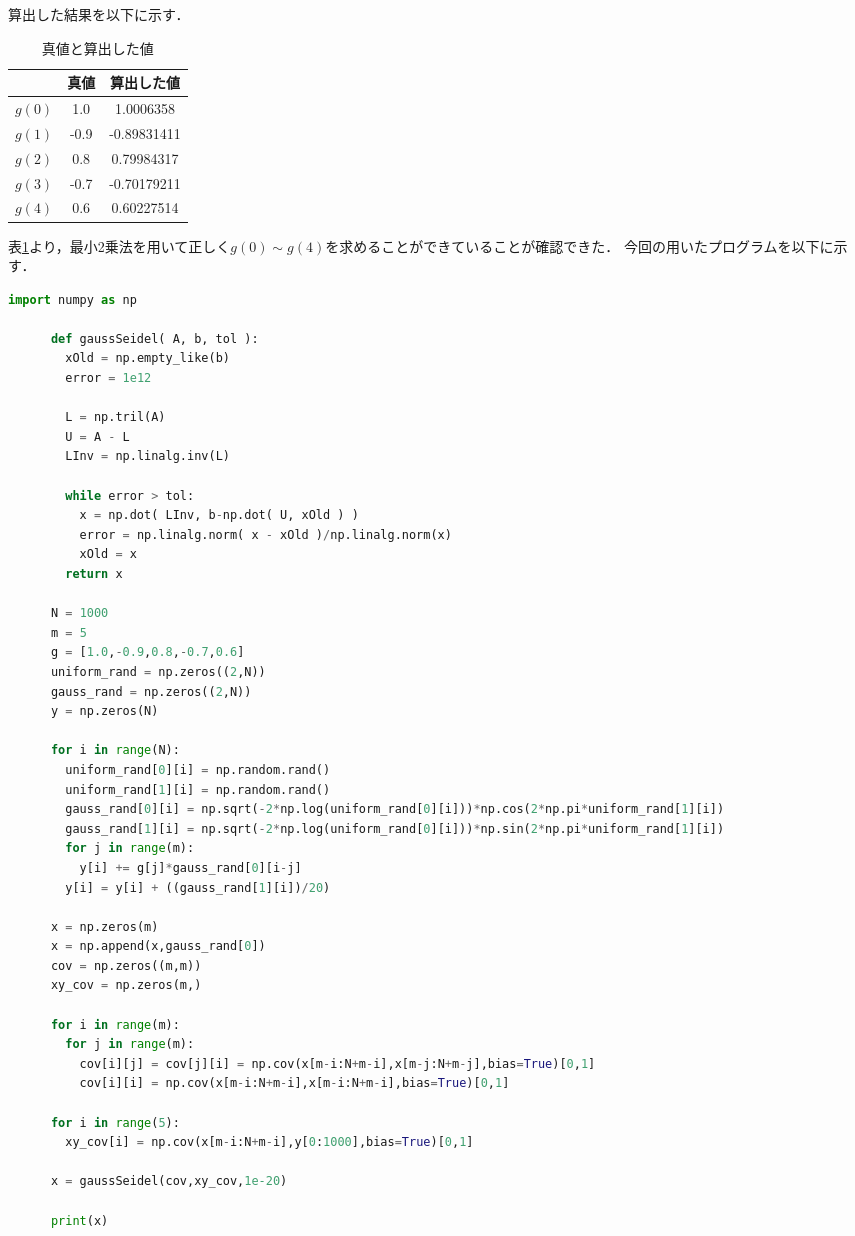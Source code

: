 \documentclass[10pt,dvipdfmx]{jarticle}
\begin{document}
    算出した結果を以下に示す．
    \begin{table}[h]
      \caption{真値と算出した値}
      \label{a}
      \centering
      \begin{tabular}{|c|c|c|} \hline
        & 真値 & 算出した値 \\ \hline
        $g(0)$ & 1.0 & 1.0006358 \\ \hline
        $g(1)$ & -0.9 & -0.89831411 \\ \hline
        $g(2)$ & 0.8 & 0.79984317 \\ \hline
        $g(3)$ & -0.7 & -0.70179211 \\ \hline
        $g(4)$ & 0.6 & 0.60227514 \\ \hline
        \end{tabular}
    \end{table}
    表\ref{a}より，最小2乗法を用いて正しく$g(0) \sim g(4)$を求めることができていることが確認できた．
    今回の用いたプログラムを以下に示す．


    \newpage
    \begin{lstlisting}[language=python]
      import numpy as np

      def gaussSeidel( A, b, tol ):
        xOld = np.empty_like(b)
        error = 1e12

        L = np.tril(A)
        U = A - L
        LInv = np.linalg.inv(L)

        while error > tol:
          x = np.dot( LInv, b-np.dot( U, xOld ) )
          error = np.linalg.norm( x - xOld )/np.linalg.norm(x)
          xOld = x
        return x

      N = 1000
      m = 5
      g = [1.0,-0.9,0.8,-0.7,0.6]
      uniform_rand = np.zeros((2,N))
      gauss_rand = np.zeros((2,N))
      y = np.zeros(N)

      for i in range(N):
        uniform_rand[0][i] = np.random.rand()
        uniform_rand[1][i] = np.random.rand()
        gauss_rand[0][i] = np.sqrt(-2*np.log(uniform_rand[0][i]))*np.cos(2*np.pi*uniform_rand[1][i])
        gauss_rand[1][i] = np.sqrt(-2*np.log(uniform_rand[0][i]))*np.sin(2*np.pi*uniform_rand[1][i])
        for j in range(m):
          y[i] += g[j]*gauss_rand[0][i-j]
        y[i] = y[i] + ((gauss_rand[1][i])/20)

      x = np.zeros(m)
      x = np.append(x,gauss_rand[0])
      cov = np.zeros((m,m))
      xy_cov = np.zeros(m,)

      for i in range(m):
        for j in range(m):
          cov[i][j] = cov[j][i] = np.cov(x[m-i:N+m-i],x[m-j:N+m-j],bias=True)[0,1]
          cov[i][i] = np.cov(x[m-i:N+m-i],x[m-i:N+m-i],bias=True)[0,1]

      for i in range(5):
        xy_cov[i] = np.cov(x[m-i:N+m-i],y[0:1000],bias=True)[0,1]

      x = gaussSeidel(cov,xy_cov,1e-20)

      print(x)
    \end{lstlisting}
\end{document}

